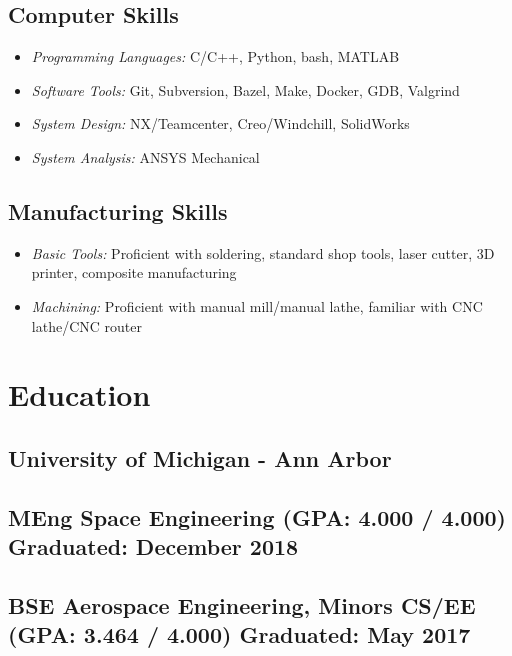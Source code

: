 \documentclass{article}
\begin{document}
\subsection{Computer Skills}
\begin{itemize}
    \item \textit{Programming Languages:} C/C++, Python, bash, MATLAB
    \item \textit{Software Tools:} Git, Subversion, Bazel, Make, Docker, GDB, Valgrind
    \item \textit{System Design:} NX/Teamcenter, Creo/Windchill, SolidWorks
    \item \textit{System Analysis:} ANSYS Mechanical
\end{itemize}

\subsection{Manufacturing Skills}
\begin{itemize}
    \item \textit{Basic Tools:} Proficient with soldering, standard shop tools, laser cutter, 3D printer, composite manufacturing
    \item \textit{Machining:} Proficient with manual mill/manual lathe, familiar with CNC lathe/CNC router
\end{itemize}

\bigskip

\section{Education}
\subsection{\textbf{University of Michigan - Ann Arbor}}
\subsection{MEng Space Engineering (GPA: 4.000 / 4.000) \hfill Graduated: December 2018}
\subsection{BSE Aerospace Engineering, Minors CS/EE (GPA: 3.464 / 4.000) \hfill Graduated: May 2017}
\end{document}
